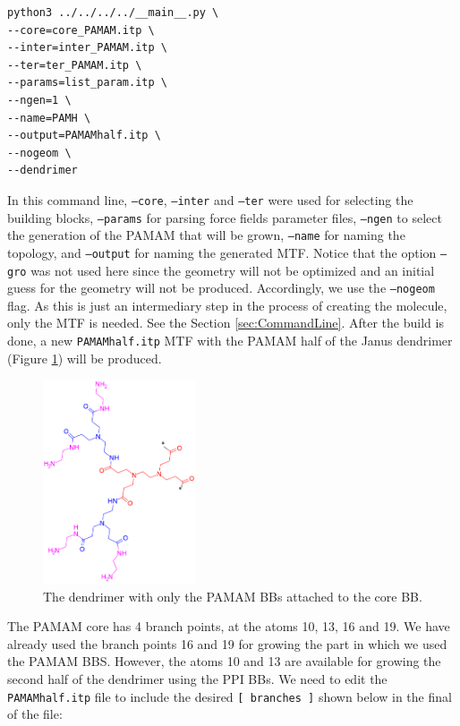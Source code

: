 \begin{lstlisting}
python3 ../../../../__main__.py \
--core=core_PAMAM.itp \
--inter=inter_PAMAM.itp \
--ter=ter_PAMAM.itp \
--params=list_param.itp \
--ngen=1 \
--name=PAMH \
--output=PAMAMhalf.itp \
--nogeom \
--dendrimer
\end{lstlisting}

In this command line, \texttt{--core}, \texttt{--inter} and \texttt{--ter} were used for selecting the building blocks, \texttt{--params} for parsing force fields parameter files, \texttt{--ngen} to select the generation of the PAMAM that will be grown, \texttt{--name} for naming the topology, and \texttt{--output} for naming the generated MTF.
Notice that the option \texttt{--gro} was not used here since the geometry will not be optimized and an initial guess for the geometry will not be produced.
Accordingly, we use the \texttt{--nogeom} flag.
As this is just an intermediary step in the process of creating the molecule, only the MTF is needed.
See the Section \ref{sec:CommandLine}.
After the build is done, a new \texttt{PAMAMhalf.itp} MTF with the PAMAM half of the Janus dendrimer (Figure \ref{fig:JanusPAMAMhalf}) will be produced.

\begin{figure}
    \centering
    \includegraphics[width=0.4\textwidth]{PAMAM_PPI-Janus/JANUSPAMAMhalf.png}
    \caption{The dendrimer with only the PAMAM BBs attached to the core BB.}
    \label{fig:JanusPAMAMhalf}
\end{figure}

The PAMAM core has 4 branch points, at the atoms 10, 13, 16 and 19.
We have already used the branch points 16 and 19 for growing the part in which we used the PAMAM BBS.
However, the atoms 10 and 13 are available for growing the second half of the dendrimer using the PPI BBs.
We need to edit the \texttt{PAMAMhalf.itp} file
to include the desired \texttt{[ branches ]} shown below in the final of the file:


